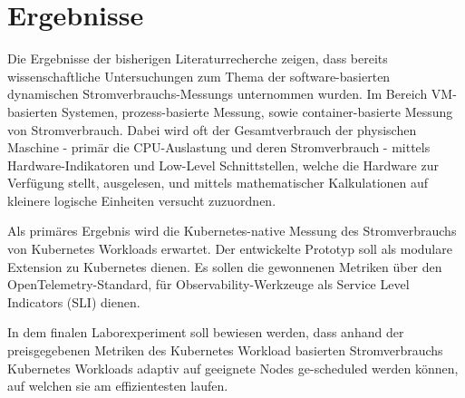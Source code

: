 \chapter{Ergebnisse}

Die Ergebnisse der bisherigen Literaturrecherche zeigen,
dass bereits wissenschaftliche Untersuchungen zum Thema
der software-basierten dynamischen Stromverbrauchs-Messungs
unternommen wurden. 
Im Bereich VM-basierten Systemen, prozess-basierte Messung, sowie container-basierte Messung
von Stromverbrauch. Dabei wird oft der Gesamtverbrauch der physischen Maschine - primär die 
CPU-Auslastung und deren Stromverbrauch -
mittels Hardware-Indikatoren und Low-Level Schnittstellen, welche die Hardware zur Verfügung stellt, ausgelesen,
und mittels mathematischer Kalkulationen auf kleinere logische Einheiten versucht zuzuordnen.
\bigskip

Als primäres Ergebnis wird die Kubernetes-native Messung des Stromverbrauchs von Kubernetes Workloads
erwartet. Der entwickelte Prototyp soll als modulare Extension zu Kubernetes dienen.
Es sollen die gewonnenen Metriken über den OpenTelemetry-Standard,
für Observability-Werkzeuge als Service Level Indicators (SLI) dienen.
\bigskip

In dem finalen Laborexperiment soll bewiesen werden, dass
anhand der preisgegebenen Metriken des Kubernetes Workload basierten Stromverbrauchs
Kubernetes Workloads adaptiv auf geeignete Nodes ge-scheduled werden können,
auf welchen sie am effizientesten laufen.
